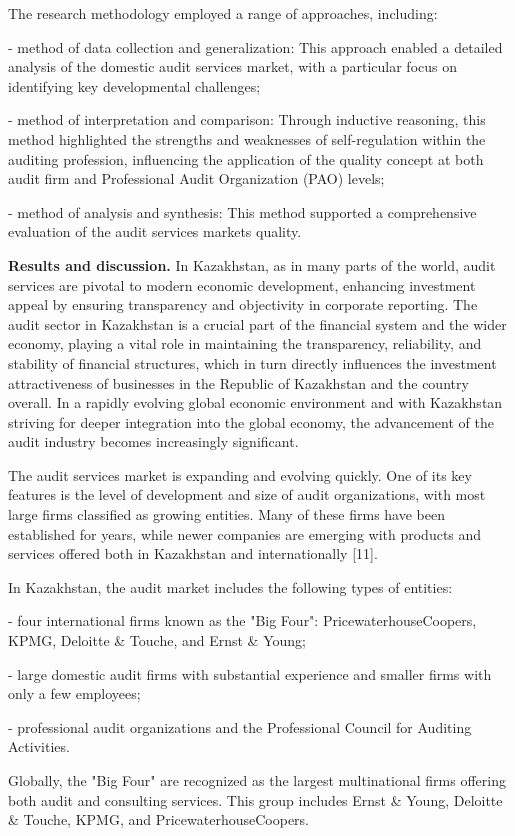 \begin{multicols}{2}
The research methodology employed a range of approaches, including:

-  method of data collection and generalization: This approach enabled a
detailed analysis of the domestic audit services market, with a
particular focus on identifying key developmental challenges;

-  method of interpretation and comparison: Through inductive reasoning,
this method highlighted the strengths and weaknesses of self-regulation
within the auditing profession, influencing the application of the
quality concept at both audit firm and Professional Audit Organization
(PAO) levels;

-  method of analysis and synthesis: This method supported a
comprehensive evaluation of the audit services market\textquotesingle s
quality.

\textbf{Results and discussion.} In Kazakhstan, as in many parts of the
world, audit services are pivotal to modern economic development,
enhancing investment appeal by ensuring transparency and objectivity in
corporate reporting. The audit sector in Kazakhstan is a crucial part of
the financial system and the wider economy, playing a vital role in
maintaining the transparency, reliability, and stability of financial
structures, which in turn directly influences the investment
attractiveness of businesses in the Republic of Kazakhstan and the
country overall. In a rapidly evolving global economic environment and
with Kazakhstan striving for deeper integration into the global economy,
the advancement of the audit industry becomes increasingly significant.

The audit services market is expanding and evolving quickly. One of its
key features is the level of development and size of audit
organizations, with most large firms classified as growing entities.
Many of these firms have been established for years, while newer
companies are emerging with products and services offered both in
Kazakhstan and internationally {[}11{]}.

In Kazakhstan, the audit market includes the following types of
entities:

-  four international firms known as the "Big Four":
PricewaterhouseCoopers, KPMG, Deloitte \& Touche, and Ernst \& Young;

-  large domestic audit firms with substantial experience and smaller firms
with only a few employees;

-  professional audit organizations and the Professional Council for
Auditing Activities.

Globally, the "Big Four" are recognized as the largest multinational
firms offering both audit and consulting services. This group includes
Ernst \& Young, Deloitte \& Touche, KPMG, and PricewaterhouseCoopers.
\end{multicols}

